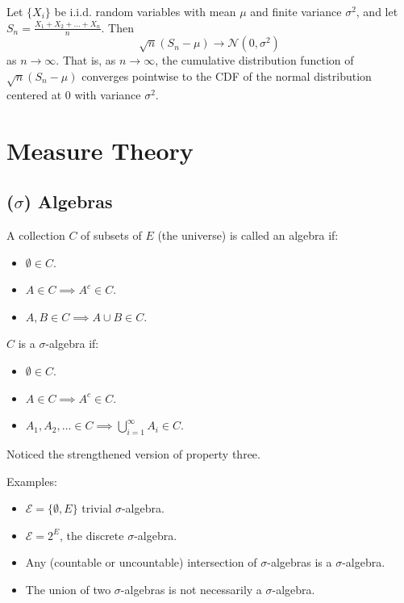 \documentclass[12pt, titlepage]{article}
\begin{document}
\begin{theo}{}
Let $\{X_i\}$ be i.i.d. random variables with mean $\mu$ and finite variance $\sigma^2$, and let $S_n = \frac{X_1 + X_2 + \dots + X_n}{n}$. Then
\[\sqrt{n}(S_n - \mu) \to \mathcal{N}(0, \sigma^2)\]
as $n \to \infty$. That is, as $n \to \infty$, the cumulative distribution function of $\sqrt{n}(S_n - \mu)$ converges pointwise to the CDF of the normal distribution centered at $0$ with variance $\sigma^2$.
\end{theo}

\section{Measure Theory}

\subsection{($\sigma$) Algebras}

\begin{dfn}
	A collection $C$ of subsets of $E$ (the universe) is called an algebra if:
	\begin{itemize}
		\item $\emptyset \in C$.
		\item $A \in C \implies A^c \in C$.
		\item $A, B \in C \implies A \cup B \in C$.
	\end{itemize}
	$C$ is a $\sigma$-algebra if:
	\begin{itemize}
		\item $\emptyset \in C$.
		\item $A \in C \implies A^c \in C$.
		\item $A_1, A_2, \dots \in C \implies \bigcup^\infty_{i = 1}A_i \in C$.
	\end{itemize}
	Noticed the strengthened version of property three.
\end{dfn}

Examples:
\begin{itemize}
	\item $\mathcal{E} = \{\emptyset, E\}$ trivial $\sigma$-algebra.
	\item $\mathcal{E} = 2^E$, the discrete $\sigma$-algebra.
\end{itemize}

\begin{theo}{}
\begin{itemize}
	\item Any (countable or uncountable) intersection of $\sigma$-algebras is a $\sigma$-algebra.
	\item The union of two $\sigma$-algebras is not necessarily a $\sigma$-algebra.\\
\end{itemize}
\end{theo}
\end{document}
